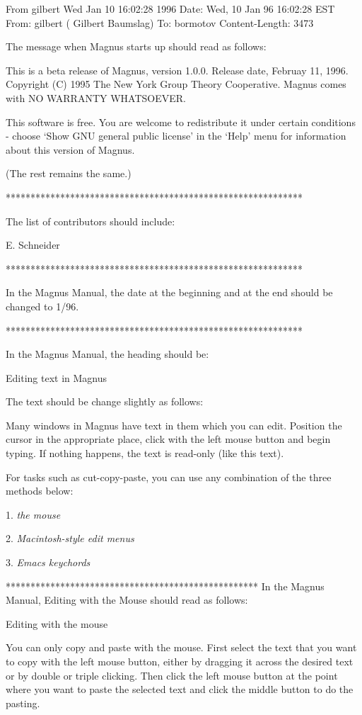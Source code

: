 From gilbert Wed Jan 10 16:02:28 1996
Date: Wed, 10 Jan 96 16:02:28 EST
From: gilbert ( Gilbert Baumslag)
To: bormotov
Content-Length: 3473

The message when Magnus starts up should read as follows:

This is a  beta release of Magnus, version 1.0.0. Release
date, Februay 11, 1996. Copyright (C) 1995 The New York 
Group Theory Cooperative. Magnus comes with NO WARRANTY 
WHATSOEVER. 

This software is free. You are welcome to redistribute
it under certain conditions - choose `Show GNU general public
license' in the `Help' menu for information about this version
of Magnus.

(The rest remains the same.)

************************************************************

The list of contributors should include:

E. Schneider

************************************************************

In the Magnus Manual, the date at the beginning and at the
end should be changed to 1/96.

************************************************************

In the Magnus Manual, the heading should be:

Editing text in Magnus


The text should be change slightly as follows:

Many windows in Magnus have text in them
which you can edit. Position the cursor in
the appropriate place, click with the left
mouse button and begin typing. If nothing
happens, the text is read-only (like this
text).

For tasks such as cut-copy-paste, you can use
any combination of the three methods below:

1. {\it the mouse}

2. {\it Macintosh-style edit menus}

3. {\it Emacs keychords}

***************************************************
In the Magnus Manual, Editing with the Mouse should
read as follows:

Editing with the mouse

You can only copy and paste with the mouse.
First select the text that you want to copy
with the left mouse button, either by dragging
it across the desired text or by double or 
triple clicking. Then click the left mouse 
button at the point where you want to paste
the selected text and click the middle button
to do the pasting.

